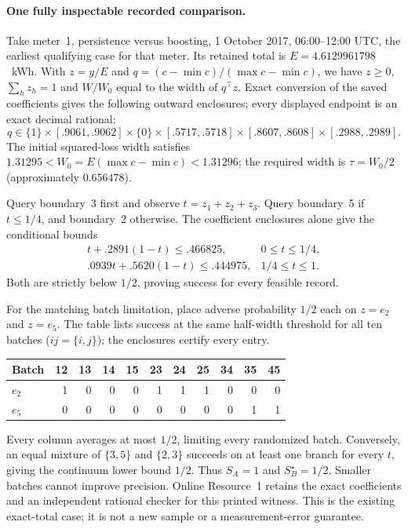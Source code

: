 \paragraph{One fully inspectable recorded comparison.}\label{sec:worked-counter-example}
Take meter~1, persistence versus boosting, 1 October 2017, 06:00--12:00
UTC, the earliest qualifying case for that meter. Its retained total is
$E=4.6129961798$~kWh. With $z=y/E$ and
$q=(c-\min c)/(\max c-\min c)$, we have $z\geq0$, $\sum_hz_h=1$ and
$W/W_0$ equal to the width of $q^\top z$. Exact conversion of the saved
coefficients gives the following outward enclosures; every displayed
endpoint is an exact decimal rational:
\[
q\in\{1\}\times[.9061,.9062]\times\{0\}
\times[.5717,.5718]\times[.8607,.8608]\times[.2988,.2989].
\]
The initial squared-loss width satisfies
$1.31295<W_0=E(\max c-\min c)<1.31296$; the required width is
$\tau=W_0/2$ (approximately $0.656478$).

Query boundary~3 first and observe $t=z_1+z_2+z_3$.
Query boundary~5 if $t\leq1/4$, and boundary~2 otherwise.
The coefficient enclosures alone give the conditional bounds
\[
\begin{array}{ll}
t+.2891(1-t)\leq .466825,&0\leq t\leq1/4,\\
.0939t+.5620(1-t)\leq .444975,&1/4\leq t\leq1.
\end{array}
\]
Both are strictly below $1/2$, proving success for every feasible record.

For the matching batch limitation, place adverse probability $1/2$ each on
$z=e_2$ and $z=e_5$. The table lists success at the same half-width threshold
for all ten batches ($ij=\{i,j\}$); the enclosures certify every entry.
\begin{center}\small
\begin{tabular}{lrrrrrrrrrr}\toprule
Batch &12&13&14&15&23&24&25&34&35&45\\\midrule
$e_2$ &1&0&0&0&1&1&1&0&0&0\\
$e_5$ &0&0&0&0&0&0&0&0&1&1\\\bottomrule
\end{tabular}
\end{center}
Every column averages at most $1/2$, limiting every randomized batch.
Conversely, an equal mixture of $\{3,5\}$ and $\{2,3\}$ succeeds on
at least one branch for every $t$, giving the continuum lower bound $1/2$.
Thus $S_A=1$ and $S_B^\star=1/2$. Smaller batches cannot improve precision.
Online Resource~1 retains the exact coefficients and an independent
rational checker for this printed witness. This is the existing exact-total
case; it is not a new sample or a measurement-error guarantee.
